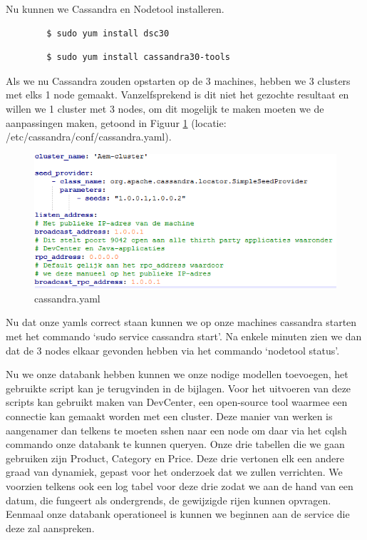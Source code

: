 \documentclass{article}
\begin{document}
	\par
	Nu kunnen we Cassandra en Nodetool installeren.
	\begin{lstlisting}
		$ sudo yum install dsc30
	\end{lstlisting}
	\begin{lstlisting}
		$ sudo yum install cassandra30-tools
	\end{lstlisting}
	
	\par
	Als we nu Cassandra zouden opstarten op de 3 machines, hebben we 3 clusters met elks 1 node gemaakt. 
	Vanzelfsprekend is dit niet het gezochte resultaat en willen we 1 cluster met 3 nodes, om dit mogelijk te maken moeten we de aanpassingen maken, getoond in Figuur \ref{fig:cassandra.yaml} (locatie: /etc/cassandra/conf/cassandra.yaml).
	\begin{figure}[h!]
  		\includegraphics[width=\linewidth]{images/cassandra-yaml.PNG}
  		\caption{cassandra.yaml}
  		\label{fig:cassandra.yaml}
	\end{figure}
	
	\par
	Nu dat onze yamls correct staan kunnen we op onze machines cassandra starten met het commando ‘sudo service cassandra start’. 
	Na enkele minuten zien we dan dat de 3 nodes elkaar gevonden hebben via het commando ‘nodetool status’.
	
	\par
	 Nu we onze databank hebben kunnen we onze nodige modellen toevoegen, het gebruikte script kan je terugvinden in de bijlagen.
	 Voor het uitvoeren van deze scripts kan gebruikt maken van DevCenter, een open-source tool waarmee een connectie kan gemaakt worden met een cluster. 
	 Deze manier van werken is aangenamer dan telkens te moeten sshen naar een node om daar via het cqlsh commando onze databank te kunnen queryen. 
	 Onze drie tabellen die we gaan gebruiken zijn Product, Category en Price. 
	 Deze drie vertonen elk een andere graad van dynamiek, gepast voor het onderzoek dat we zullen verrichten.
	 We voorzien telkens ook een log tabel voor deze drie zodat we aan de hand van een datum, die fungeert als ondergrends, de gewijzigde rijen kunnen opvragen.
	 Eenmaal onze databank operationeel is kunnen we beginnen aan de service die deze zal aanspreken.
\end{document}

